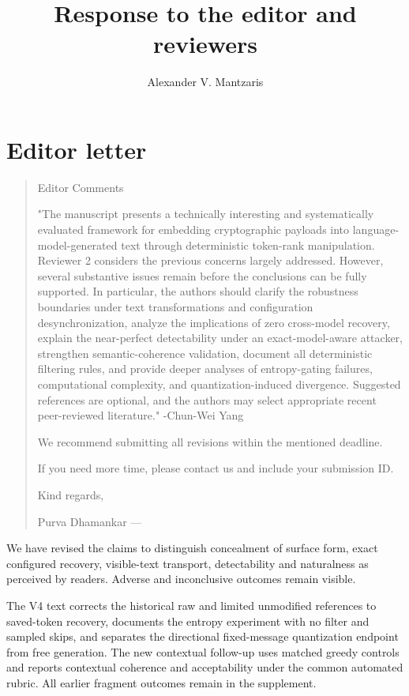 \documentclass[11pt]{article}
\title{Response to the editor and reviewers}
\author{Alexander V. Mantzaris}
\date{}
\newenvironment{reviewcomment}{\begin{quote}\color{commentgray}\itshape}{\end{quote}}
\begin{document}
\maketitle


\section*{Editor letter}\label{resp:editor_letter}
\begin{reviewcomment}


Editor Comments

"The manuscript presents a technically interesting and systematically evaluated framework for embedding cryptographic payloads into language-model-generated text through deterministic token-rank manipulation. Reviewer 2 considers the previous concerns largely addressed. However, several substantive issues remain before the conclusions can be fully supported. In particular, the authors should clarify the robustness boundaries under text transformations and configuration desynchronization, analyze the implications of zero cross-model recovery, explain the near-perfect detectability under an exact-model-aware attacker, strengthen semantic-coherence validation, document all deterministic filtering rules, and provide deeper analyses of entropy-gating failures, computational complexity, and quantization-induced divergence. Suggested references are optional, and the authors may select appropriate recent peer-reviewed literature."
-Chun-Wei Yang

We recommend submitting all revisions within the mentioned deadline.

If you need more time, please contact us and include your submission ID.

Kind regards,

Purva Dhamankar
---
\end{reviewcomment}



We have revised the claims to distinguish concealment of surface form, exact configured recovery, visible-text transport, detectability and naturalness as perceived by readers. Adverse and inconclusive outcomes remain visible.

 The V4 text corrects the historical raw and limited unmodified references to saved-token recovery, documents the entropy experiment with no filter and sampled skips, and separates the directional fixed-message quantization endpoint from free generation. The new contextual follow-up uses matched greedy controls and reports contextual coherence and acceptability under the common automated rubric. All earlier fragment outcomes remain in the supplement.
\end{document}
